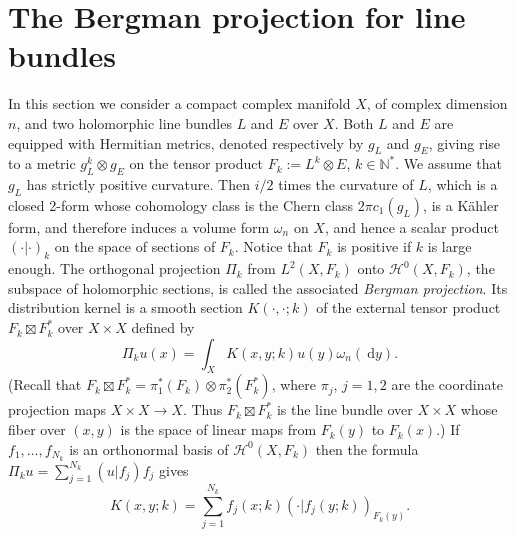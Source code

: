 \documentclass{article}
\newcommand{\DD}{\:\!\mathrm{d}}
\newcommand{\NM}{\mathbb{N}}
\newcommand{\pscal}[2]{\left(#1 | #2\right)}
\begin{document}
\section{The Bergman projection for line bundles}
\label{sec:line-bundle}

In this section we consider a compact complex manifold $X$, of complex
dimension $n$, and two holomorphic line bundles $L$ and $E$ over
$X$. Both $L$ and $E$ are equipped with Hermitian metrics, denoted
respectively by $g_L$ and $g_E$, giving rise to a metric
$g_L^k\otimes g_E$ on the tensor product $F_k:=L^k \otimes E$,
$k\in\NM^*$. We assume that $g_L$ has strictly positive
curvature. Then $i/2$ times the curvature of $L$, which is a closed
2-form whose cohomology class is the Chern class $2\pi c_1(g_L)$, is a
Kähler form, and therefore induces a volume form $\omega_n$ on $X$,
and hence a scalar product $\pscal{\cdot}{\cdot}_k$ on the space of
sections of $F_k$. Notice that $F_k$ is positive if $k$ is large
enough. The orthogonal projection $\Pi_k$ from $L^2(X,F_k)$ onto
$\mathcal{H}^0(X,F_k)$, the subspace of holomorphic sections, is
called the associated \emph{Bergman projection}. Its distribution
kernel is a smooth section $K(\cdot,\cdot;k)$ of the external tensor
product $F_k \boxtimes F_k^*$ over $X\times X$ defined by
\[
\Pi_k u (x) = \int_X K(x,y;k) u(y) \omega_n(\DD y).
\]
(Recall that
$F_k \boxtimes F_k^* = \pi_1^* (F_k) \otimes \pi_2^*(F_k^*)$, where
$\pi_j$, $j=1,2$ are the coordinate projection maps $X\times X \to X$.
Thus $F_k \boxtimes F_k^*$ is the line bundle over $X\times X$ whose
fiber over $(x,y)$ is the space of linear maps from $F_k(y)$ to
$F_k(x)$.)  If $f_1,\dots,f_{N_k}$ is an orthonormal basis of
$\mathcal{H}^0(X,F_k)$ then the formula
$\Pi_k u = \sum_{j=1}^{N_k} \pscal{u}{f_j}f_j$ gives
\begin{equation}
  \label{equ:K_basis}
  K(x,y;k) = \sum_{j=1}^{N_k} f_j(x;k)\pscal{\cdot}{f_j(y;k)}_{F_k(y)}.
\end{equation}
\end{document}
